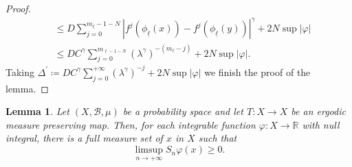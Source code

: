 \documentclass[10pt,a4paper]{amsart}
\numberwithin{equation}{section} %
\numberwithin{figure}{section} %
\newtheorem{lemm}[prop]{Lemma}
\newcommand{\R}{\mathbb{R}}
\newcommand{\sB}{\mathscr{B}}
\renewcommand{\=}{\coloneqq}
\begin{document}
\begin{proof}
\begin{equation*}
\begin{split}
            &\leq D\sum_{j=0}^{m_{\underline{\ell}}-1-N}|f^{j}(\phi_{\underline{\ell}}(x)) - f^j(\phi_{\underline{\ell}}(y))|^{\gamma} + 2N\sup |\varphi|\\
            &\leq DC^\gamma \sum_{j=0}^{m_{\underline{\ell}-1-N}} (\lambda^{\gamma})^{-(m_{{\underline{\ell}}}-j)} + 2N\sup|\varphi|.
            \end{split}
        \end{equation*}
        Taking $\Delta^{'} \= DC^{\gamma} \sum_{j=0}^{+\infty} (\lambda^{\gamma})^{-j}  + 2N\sup |\varphi|$ we finish the proof of the lemma.
    \end{proof}
    \begin{lemm}\label{lemma 4 key lemma}
        Let $(X,\sB,\mu)$ be a probability space and let $T\colon X\to X$ be an ergodic measure preserving map. Then, for each integrable function $\varphi\colon X\to\R$ with null integral, there is a full measure set of $x$ in $X$ such that
        \begin{equation}
            \limsup_{n\to+\infty} S_n\varphi(x) \geq 0.
        \end{equation}
    \end{lemm}
\end{document}
